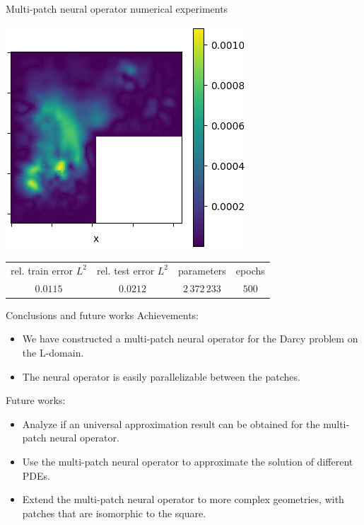 \documentclass{beamer}
\begin{document}
\begin{frame}{Multi-patch neural operator numerical experiments}
\begin{center}
\begin{minipage}{0.24\textwidth}
        \end{minipage}
        \hfill
        \begin{minipage}{0.24\textwidth}
            \includegraphics[width=\textwidth]{MPNO_error.png}
        \end{minipage}
    \end{center}
	\begin{table}[h!] %
		\centering
		\begin{tabular}{cccc}\toprule
		rel. train error $ L^2 $ & rel. test error $L^2$ & parameters & epochs \\
			\cmidrule{1-4}
			$ 0.0115 $ & $0.0212$ & $ 2\, 372\, 233 $ & $500$ \\
			\bottomrule
		\end{tabular}
	\end{table}
\end{frame}


\begin{frame}{Conclusions and future works}
	Achievements:
	\begin{itemize}
		\item We have constructed a multi-patch neural operator for the Darcy problem on the L-domain.
		\item The neural operator is easily parallelizable between the patches.
	\end{itemize}
	\pause
	Future works:
	\begin{itemize}
		\item Analyze if an universal approximation result can be obtained for the multi-patch neural operator.
		\item Use the multi-patch neural operator to approximate the solution of different PDEs.
		\item Extend the multi-patch neural operator to more complex geometries, with patches that are isomorphic to the square.
	\end{itemize}
\end{frame}
\end{document}
